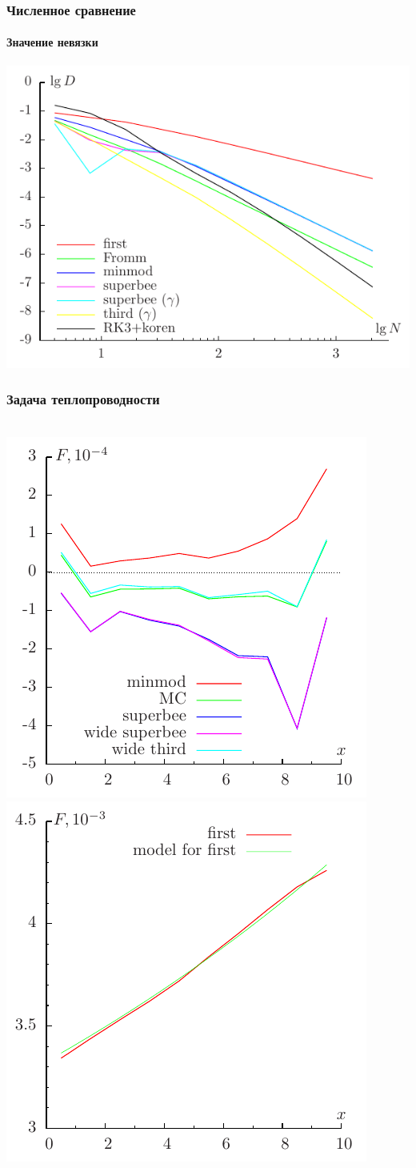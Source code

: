 \documentclass[ucs]{beamer}
\begin{document}
\begin{frame}
	\frametitle{Численное сравнение}
	\framesubtitle{Значение невязки}
	\begin{center}
		\includegraphics[width=.8\textwidth]{residual/09_3dis}
	\end{center}
\end{frame}

\begin{frame}
	\frametitle{Задача теплопроводности}
	 \\
	\includegraphics[width=.5\textwidth]{rare_flow}
	\includegraphics[width=.5\textwidth]{rare_first}
\end{frame}
\end{document}
